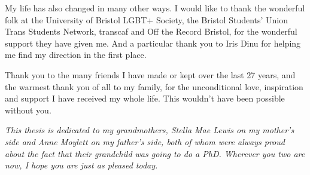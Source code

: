 My life has also changed in many other ways. I would like to thank the wonderful folk at the University of Bristol LGBT+ Society, the Bristol Students' Union Trans Students Network, transcaf and Off the Record Bristol, for the wonderful support they have given me. And a particular thank you to Iris Dinu for helping me find my direction in the first place.

Thank you to the many friends I have made or kept over the last 27 years, and the warmest thank you of all to my family, for the unconditional love, inspiration and support I have received my whole life. This wouldn't have been possible without you.

\vspace{1cm}

\emph{This thesis is dedicated to my grandmothers, Stella Mae Lewis on my mother's side and Anne Moylett on my father's side, both of whom were always proud about the fact that their grandchild was going to do a PhD. Wherever you two are now, I hope you are just as pleased today.}
